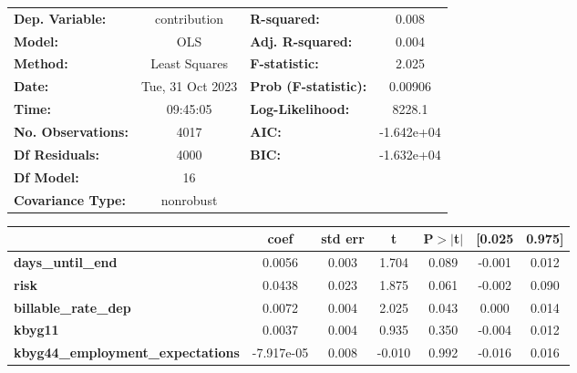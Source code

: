 \begin{center}
\begin{tabular}{lclc}
\toprule
\textbf{Dep. Variable:}                   &   contribution   & \textbf{  R-squared:         } &     0.008   \\
\textbf{Model:}                           &       OLS        & \textbf{  Adj. R-squared:    } &     0.004   \\
\textbf{Method:}                          &  Least Squares   & \textbf{  F-statistic:       } &     2.025   \\
\textbf{Date:}                            & Tue, 31 Oct 2023 & \textbf{  Prob (F-statistic):} &  0.00906    \\
\textbf{Time:}                            &     09:45:05     & \textbf{  Log-Likelihood:    } &    8228.1   \\
\textbf{No. Observations:}                &        4017      & \textbf{  AIC:               } & -1.642e+04  \\
\textbf{Df Residuals:}                    &        4000      & \textbf{  BIC:               } & -1.632e+04  \\
\textbf{Df Model:}                        &          16      & \textbf{                     } &             \\
\textbf{Covariance Type:}                 &    nonrobust     & \textbf{                     } &             \\
\bottomrule
\end{tabular}
\begin{tabular}{lcccccc}
                                          & \textbf{coef} & \textbf{std err} & \textbf{t} & \textbf{P$> |$t$|$} & \textbf{[0.025} & \textbf{0.975]}  \\
\midrule
\textbf{days\_until\_end}                 &       0.0056  &        0.003     &     1.704  &         0.089        &       -0.001    &        0.012     \\
\textbf{risk}                             &       0.0438  &        0.023     &     1.875  &         0.061        &       -0.002    &        0.090     \\
\textbf{billable\_rate\_dep}              &       0.0072  &        0.004     &     2.025  &         0.043        &        0.000    &        0.014     \\
\textbf{kbyg11}                           &       0.0037  &        0.004     &     0.935  &         0.350        &       -0.004    &        0.012     \\
\textbf{kbyg44\_employment\_expectations} &   -7.917e-05  &        0.008     &    -0.010  &         0.992        &       -0.016    &        0.016     \\

\end{tabular}
\end{center}
